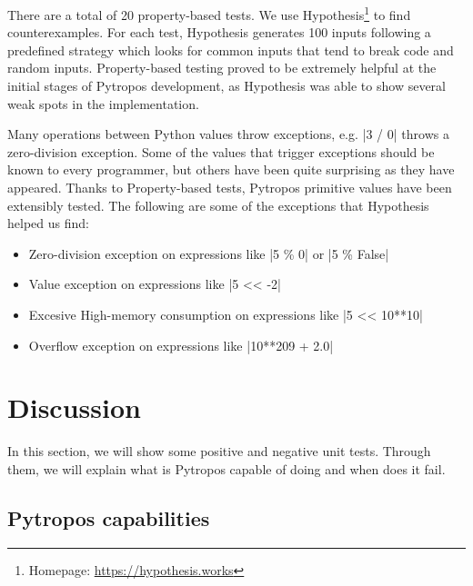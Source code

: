 There are a total of 20 property-based tests. We use Hypothesis\footnote{Homepage:
\url{https://hypothesis.works}} to find counterexamples. For each test, Hypothesis
generates 100 inputs following a predefined strategy which looks for common inputs that
tend to break code and random inputs. Property-based testing proved to be extremely
helpful at the initial stages of Pytropos development, as Hypothesis was able to show
several weak spots in the implementation.

Many operations between Python values throw exceptions, e.g. \pycode|3 / 0| throws a
zero-division exception. Some of the values that trigger exceptions should be known to
every programmer, but others have been quite surprising as they have appeared. Thanks to
Property-based tests, Pytropos primitive values have been extensibly tested. The following
are some of the exceptions that Hypothesis helped us find:

\begin{itemize}
\tightlist
\item Zero-division exception on expressions like \pycode|5 \% 0| or \pycode|5 \% False|
\item Value exception on expressions like \pycode|5 << -2|
\item Excesive High-memory consumption on expressions like \pycode|5 << 10**10|
\item Overflow exception on expressions like \pycode|10**209 + 2.0|
\end{itemize}

\section{Discussion}\label{discussion}

In this section, we will show some positive and negative unit tests. Through them, we will
explain what is Pytropos capable of doing and when does it fail.

\subsection*{Pytropos capabilities}

